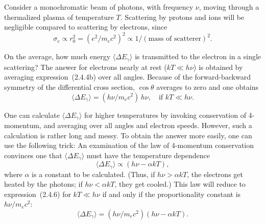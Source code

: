 Consider a monochromatic beam of photons, with frequency $\nu$, moving
through a thermalized plasma of temperature $T$.  Scattering by protons and ions
will be negligible compared to scattering by electrons, since
\begin{equation}
\sigma_e \propto r_0^2 = (e^2/m_e c^2)^2 \propto 1/(\text{mass of scatterer})^2.
\tag{2.4.5}
\end{equation}

On the average, how much energy $\langle\Delta E_\gamma\rangle$ is transmitted to the electron in a
single scattering?  The answer for electrons nearly at rest ($kT \ll h\nu$) is obtained
by averaging expression~(2.4.4b) over all angles.  Because of the forward-backward
symmetry of the differential cross section, $\cos\theta$ averages to zero and one obtains
\begin{equation}
\langle\Delta E_\gamma\rangle = (h\nu/m_e c^2)\,h\nu, \quad \text{if } kT \ll h\nu.
\tag{2.4.6}
\end{equation}

One can calculate $\langle\Delta E_\gamma\rangle$ for higher temperatures by invoking conservation
of 4-momentum, and averaging over all angles and electron speeds.  However,
such a calculation is rather long and messy.  To obtain the answer more easily,
one can use the following trick: An examination of the law of 4-momentum
conservation convinces one that $\langle\Delta E_\gamma\rangle$ must have the temperature dependence
\begin{equation}
\langle\Delta E_\gamma\rangle \propto (h\nu - \alpha kT),
\tag{2.4.7}
\end{equation}
where $\alpha$ is a constant to be calculated.  (Thus, if $h\nu > \alpha kT$, the electrons get
heated by the photons; if $h\nu < \alpha kT$, they get cooled.)
This law will reduce to
expression~(2.4.6) for $kT \ll h\nu$ if and only if the proportionality constant is
$h\nu/m_e c^2$:
\begin{equation}
\langle\Delta E_\gamma\rangle = (h\nu/m_e c^2)(h\nu - \alpha kT).
\tag*{}
\end{equation}


